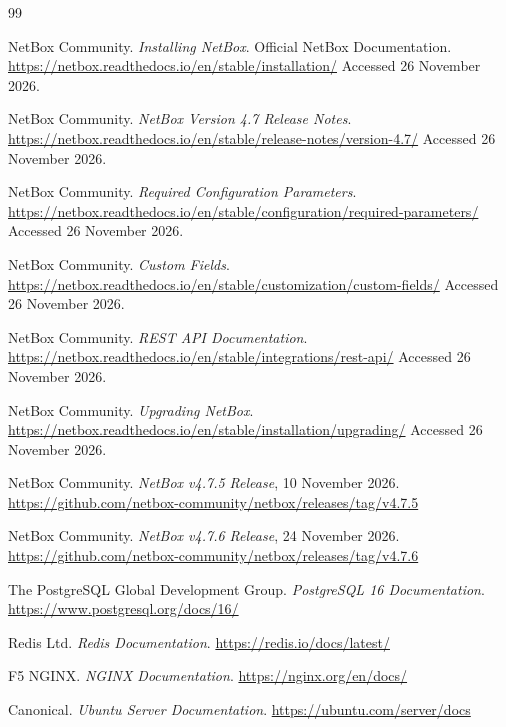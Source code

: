 \documentclass[11pt,a4paper,oneside]{report}
\begin{document}
\begin{thebibliography}{99}

NetBox Community.
\textit{Installing NetBox}.
Official NetBox Documentation.
\url{https://netbox.readthedocs.io/en/stable/installation/}
Accessed 26 November 2026.

NetBox Community.
\textit{NetBox Version 4.7 Release Notes}.
\url{https://netbox.readthedocs.io/en/stable/release-notes/version-4.7/}
Accessed 26 November 2026.

NetBox Community.
\textit{Required Configuration Parameters}.
\url{https://netbox.readthedocs.io/en/stable/configuration/required-parameters/}
Accessed 26 November 2026.

NetBox Community.
\textit{Custom Fields}.
\url{https://netbox.readthedocs.io/en/stable/customization/custom-fields/}
Accessed 26 November 2026.

NetBox Community.
\textit{REST API Documentation}.
\url{https://netbox.readthedocs.io/en/stable/integrations/rest-api/}
Accessed 26 November 2026.

NetBox Community.
\textit{Upgrading NetBox}.
\url{https://netbox.readthedocs.io/en/stable/installation/upgrading/}
Accessed 26 November 2026.

NetBox Community.
\textit{NetBox v4.7.5 Release}, 10 November 2026.
\url{https://github.com/netbox-community/netbox/releases/tag/v4.7.5}

NetBox Community.
\textit{NetBox v4.7.6 Release}, 24 November 2026.
\url{https://github.com/netbox-community/netbox/releases/tag/v4.7.6}

The PostgreSQL Global Development Group.
\textit{PostgreSQL 16 Documentation}.
\url{https://www.postgresql.org/docs/16/}

Redis Ltd.
\textit{Redis Documentation}.
\url{https://redis.io/docs/latest/}

F5 NGINX.
\textit{NGINX Documentation}.
\url{https://nginx.org/en/docs/}

Canonical.
\textit{Ubuntu Server Documentation}.
\url{https://ubuntu.com/server/docs}
\end{thebibliography}

\appendix
\end{document}

